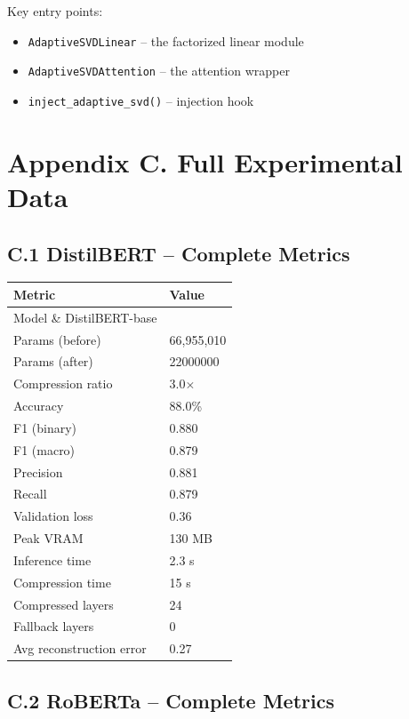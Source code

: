 Key entry points:
\begin{itemize}
\item \texttt{AdaptiveSVDLinear} -- the factorized linear module
\item \texttt{AdaptiveSVDAttention} -- the attention wrapper
\item \texttt{inject\_adaptive\_svd()} -- injection hook
\end{itemize}


\section{Appendix C. Full Experimental Data}

\subsection{C.1 DistilBERT -- Complete Metrics}

\begin{table}[H]
\centering
\small
\begin{tabular}{ll}
\toprule
\textbf{Metric} & \textbf{Value} \\
\midrule
Model \& DistilBERT-base \\
Params (before) & 66,955,010 \\
Params (after) & 22000000 \\
Compression ratio & 3.0$\times$ \\
Accuracy & 88.0\% \\
F1 (binary) & 0.880 \\
F1 (macro) & 0.879 \\
Precision & 0.881 \\
Recall & 0.879 \\
Validation loss & 0.36 \\
Peak VRAM & 130 MB \\
Inference time & 2.3 s \\
Compression time & 15 s \\
Compressed layers & 24 \\
Fallback layers & 0 \\
Avg reconstruction error & 0.27 \\
\bottomrule
\end{tabular}
\end{table}

\subsection{C.2 RoBERTa -- Complete Metrics}

